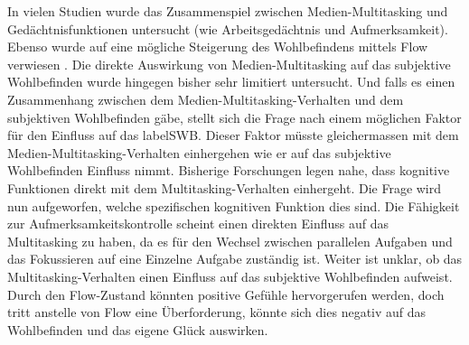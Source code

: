 In vielen Studien wurde das Zusammenspiel zwischen Medien-Multitasking und Gedächtnisfunktionen untersucht (wie Arbeitsgedächtnis und Aufmerksamkeit). Ebenso wurde auf eine mögliche Steigerung des Wohlbefindens mittels Flow verwiesen \cite{Klingberg2008}. Die direkte Auswirkung von Medien-Multitasking auf das subjektive Wohlbefinden wurde hingegen bisher sehr limitiert untersucht. Und falls es einen Zusammenhang zwischen dem Medien-Multitasking-Verhalten und dem subjektiven Wohlbefinden gäbe, stellt sich die Frage nach einem möglichen Faktor für den Einfluss auf das \gls{labelSWB}. Dieser Faktor müsste gleichermassen mit dem Medien-Multitasking-Verhalten einhergehen wie er auf das subjektive Wohlbefinden Einfluss nimmt. Bisherige Forschungen legen nahe, dass kognitive Funktionen direkt mit dem Multitasking-Verhalten einhergeht. Die Frage wird nun aufgeworfen, welche spezifischen kognitiven Funktion dies sind. Die Fähigkeit zur Aufmerksamkeitskontrolle scheint einen direkten Einfluss auf das Multitasking zu haben, da es für den Wechsel zwischen parallelen Aufgaben und das Fokussieren auf eine Einzelne Aufgabe zuständig ist. Weiter ist unklar, ob das Multitasking-Verhalten einen Einfluss auf das subjektive Wohlbefinden aufweist. Durch den Flow-Zustand könnten positive Gefühle hervorgerufen werden, doch tritt anstelle von Flow eine Überforderung, könnte sich dies negativ auf das Wohlbefinden und das eigene Glück auswirken.

